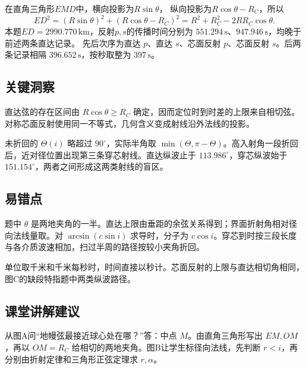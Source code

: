 \documentclass[UTF8,fontset=fandol,a4paper,11pt]{ctexart}
\begin{document}
在直角三角形$EMD$中，横向投影为$R\sin\theta$，
纵向投影为$R\cos\theta-R_C$，所以
\[
ED^2=(R\sin\theta)^2+(R\cos\theta-R_C)^2
=R^2+R_C^2-2RR_C\cos\theta.
\]
本题$ED=2990.770\,\mathrm{km}$，反射$p,s$的传播时间分别为
$551.294\,\mathrm s$、$947.946\,\mathrm s$，均晚于前述两条直达记录。
先后次序为直达 $p$、直达 $s$、芯面反射 $p$、芯面反射 $s$。后两条记录相隔 $396.652\,\mathrm s$，按秒取整为 $397\,\mathrm s$。




\subsection*{关键洞察}

直达弦的存在区间由 $R\cos\theta\ge R_C$ 确定，因而定位时到时差的上限来自相切弦。对称芯面反射使用同一不等式，几何含义变成射线沿外法线的投影。

未折回的 $\Theta(i)$ 略超过 $90^\circ$，实际半角取 $\min(\Theta,\pi-\Theta)$。高入射角一段折回后，近对径位置出现第三条穿芯射线。直达纵波止于 $113.986^\circ$，穿芯纵波始于 $151.154^\circ$，两者之间形成这两类射线的盲区。




\subsection*{易错点}

题中 $\theta$ 是两地夹角的一半。直达上限由垂距的余弦关系得到；界面折射角相对径向法线量取。对 $\arcsin(c\sin i)$ 求导时，分子为 $c\cos i$。穿芯到时按三段长度与各介质波速相加，扫过半周的路径按较小夹角折回。

单位取千米和千米每秒时，时间直接以秒计。芯面反射的上限与直达相切角相同，图C的缺段特指题中两类纵波路径。




\subsection*{课堂讲解建议}

从图A问“地幔弦最接近球心处在哪？”答：中点 $M$。由直角三角形写出 $EM,OM$，再以 $OM=R_C$ 给相切的两地夹角。图B让学生标径向法线，先判断 $r<i$，再分别由折射定律和三角形正弦定理求 $r,\alpha$。
\end{document}

